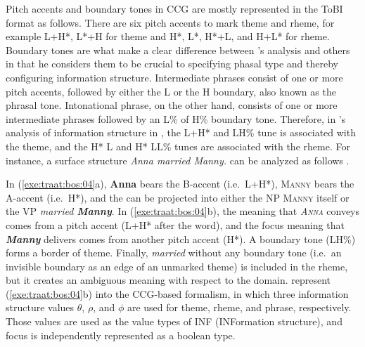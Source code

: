 Pitch accents and boundary tones in CCG are mostly represented in the
ToBI format as follows.  There are six pitch accents to mark theme and
rheme, for example L+H*, L*+H for theme and H*, L*, H*+L, and H+L* for
rheme. Boundary tones are what make a clear difference between
\citeauthor{steedman:00}'s analysis and others in that he considers
them to be crucial to specifying phasal type and thereby configuring
information structure.  Intermediate phrases consist of one or more
pitch accents, followed by either the L or the H boundary, also known
as the phrasal tone. Intonational phrase, on the other hand, consists
of one or more intermediate phrases followed by an L\% of H\% boundary
tone. Therefore, in \citeauthor{steedman:00}'s analysis of information
structure in , the L+H* and LH\% tune is associated with
the theme, and the H* L and H* LL\% tunes are associated with the
rheme. For instance, a surface structure \textit{Anna married Manny.}
can be analyzed as follows \citep[p.\ 302]{traat:bos:04}.





\noindent In (\ref{exe:traat:bos:04}a), \textbf{Anna} bears the
B-accent (i.e.\ L+H*), \textsc{Manny} bears the A-accent (i.e.\ H*),
and the  can be projected into either the NP \textsc{Manny}
itself or the VP \textit{married
  \textbf{Manny}}. In
(\ref{exe:traat:bos:04}b), the  meaning that
\textit{\textsc{Anna}} conveys comes from a pitch accent (L+H* after
the word), and the focus meaning that \textit{\textbf{Manny}} delivers
comes from another pitch accent (H*). A boundary tone (LH\%) forms a
border of theme. Finally, \textit{married} without any boundary tone
(i.e.\ an invisible boundary as an edge of an unmarked theme) is
included in the rheme, but it creates an ambiguous meaning with
respect to the  domain. \citet{traat:bos:04} represent
(\ref{exe:traat:bos:04}b) into the CCG-based formalism, in which three
information structure values \ensuremath{\theta}, \ensuremath{\rho},
and \ensuremath{\phi} are used for theme, rheme, and phrase,
respectively. Those values are used as the value types of INF
(INFormation structure), and focus is independently represented as a
boolean type.



